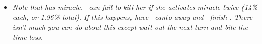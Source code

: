 \begin{tcolorbox}[title=\begin{center}Chapter 21 - Without a King\end{center},colbacktitle=blue!50!white]
\begin{enumerate}
\setcounter{enumi}{3}
\end{enumerate}
\vspace{3mm}
\begin{itemize}
    \item \textit{Note that  has miracle. \marcia\ can fail to kill her if she activates miracle twice (14\% each, or 1.96\% total). If this happens, have \marcia\ canto away and \ike\ finish . There isn’t much you can do about this except wait out the next turn and bite the time loss.}
\end{itemize}
\end{tcolorbox}